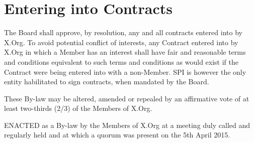\documentclass[10pt, english]{xorgdocs}
\begin{document}
\section{Entering into Contracts}
\label{section_entering_contracts}
The Board shall approve, by resolution, any and all contracts entered into by
X.Org. To avoid potential conflict of interests, any Contract entered into by
X.Org in which a Member has an interest shall have fair and reasonable terms and
conditions equivalent to such terms and conditions as would exist if the
Contract were being entered into with a non-Member. SPI is however the only
entity habilitated to sign contracts, when mandated by the Board.

These By-law may be altered, amended or repealed by an affirmative vote of
at least two-thirds (2/3) of the Members of X.Org.

\bigskip

ENACTED as a By-law by the Members of X.Org at a meeting duly called and
regularly held and at which a quorum was present on the 5th April 2015.
\end{document}
